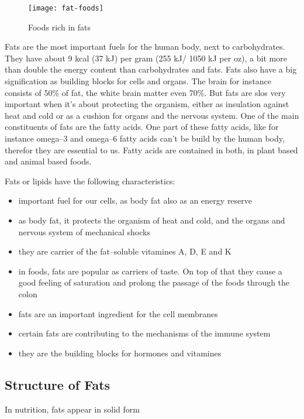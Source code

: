 \documentclass[../main.tex]{subfiles}
\begin{document}
\begin{figure}[htb!]
\centering
  \texttt{[image: fat-foods]}
  \caption{Foods rich in fats~\cite{FatFoods}}
\end{figure}

Fats are the most important fuels for the human body, next to carbohydrates.
They have about 9 kcal (37 kJ) per gram (255 kJ/ 1050 kJ per oz), a bit more than double the energy content than carbohydrates and fats.
Fats also have a big signification as building blocks for cells and organs.
The brain for instance consists of 50\% of fat, the white brain matter even 70\%.
But fats are slos very important when it's about protecting the organism,
either as insulation against heat and cold or as a cushion for organs and the nervous system.
One of the main constituents of fats are the fatty acids.
One part of these fatty acids, like for instance omega--3 and omega--6 fatty acids
can't be build by the human body, therefor they are essential to us.
Fatty acids are contained in both, in plant based and animal based foods.

Fats or lipids have the following characteristics:
\begin{itemize}
\item important fuel for our cells, as body fat also as an energy reserve
\item as body fat, it protects the organism of heat and cold, and the organs and nervous system of mechanical shocks
\item they are carrier of the fat--soluble vitamines A, D, E and K
\item in foods, fats are popular as carriers of taste. On top of that
  they cause a good feeling of saturation and prolong the passage of the foods through the colon
\item fats are an important ingredient for the cell membranes
\item certain fats are contributing to the mechanisms of the immune system
\item they are the building blocks for hormones and vitamines 
\end{itemize}

\subsection{Structure of Fats}

In nutrition, fats appear in solid form 
\end{document}
